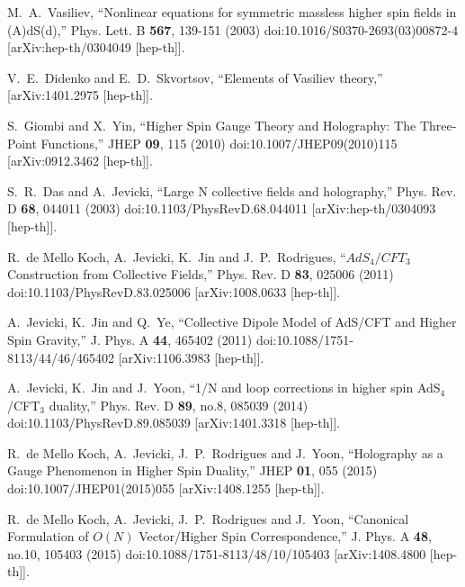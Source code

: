 \documentclass[a4paper,12pt]{article}
\begin{document}
\begin{thebibliography}{}
M.~A.~Vasiliev,
``Nonlinear equations for symmetric massless higher spin fields in (A)dS(d),''
Phys. Lett. B \textbf{567}, 139-151 (2003)
doi:10.1016/S0370-2693(03)00872-4
[arXiv:hep-th/0304049 [hep-th]].

V.~E.~Didenko and E.~D.~Skvortsov,
``Elements of Vasiliev theory,''
[arXiv:1401.2975 [hep-th]].

S.~Giombi and X.~Yin,
``Higher Spin Gauge Theory and Holography: The Three-Point Functions,''
JHEP \textbf{09}, 115 (2010)
doi:10.1007/JHEP09(2010)115
[arXiv:0912.3462 [hep-th]].

S.~R.~Das and A.~Jevicki,
``Large N collective fields and holography,''
Phys. Rev. D \textbf{68}, 044011 (2003)
doi:10.1103/PhysRevD.68.044011
[arXiv:hep-th/0304093 [hep-th]].

R.~de Mello Koch, A.~Jevicki, K.~Jin and J.~P.~Rodrigues,
``$AdS_4/CFT_3$ Construction from Collective Fields,''
Phys. Rev. D \textbf{83}, 025006 (2011)
doi:10.1103/PhysRevD.83.025006
[arXiv:1008.0633 [hep-th]].

A.~Jevicki, K.~Jin and Q.~Ye,
``Collective Dipole Model of AdS/CFT and Higher Spin Gravity,''
J. Phys. A \textbf{44}, 465402 (2011)
doi:10.1088/1751-8113/44/46/465402
[arXiv:1106.3983 [hep-th]].

A.~Jevicki, K.~Jin and J.~Yoon,
``1/N and loop corrections in higher spin AdS$_4$/CFT$_3$ duality,''
Phys. Rev. D \textbf{89}, no.8, 085039 (2014)
doi:10.1103/PhysRevD.89.085039
[arXiv:1401.3318 [hep-th]].

R.~de Mello Koch, A.~Jevicki, J.~P.~Rodrigues and J.~Yoon,
``Holography as a Gauge Phenomenon in Higher Spin Duality,''
JHEP \textbf{01}, 055 (2015)
doi:10.1007/JHEP01(2015)055
[arXiv:1408.1255 [hep-th]].

R.~de Mello Koch, A.~Jevicki, J.~P.~Rodrigues and J.~Yoon,
``Canonical Formulation of $O(N)$ Vector/Higher Spin Correspondence,''
J. Phys. A \textbf{48}, no.10, 105403 (2015)
doi:10.1088/1751-8113/48/10/105403
[arXiv:1408.4800 [hep-th]].


\end{thebibliography}
\end{document}
